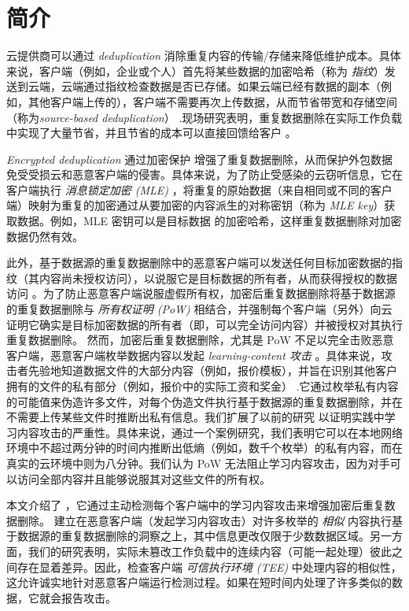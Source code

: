 \section{简介}
\label{sec:featurespy-intro}

云提供商可以通过 {\em deduplication} \cite{harnik10} 消除重复内容的传输/存储来降低维护成本。具体来说，客户端（例如，企业或个人）首先将某些数据的加密哈希（称为 {\em 指纹}）发送到云端，云端通过指纹检查数据是否已存储。如果云端已经有数据的副本（例如，其他客户端上传的），客户端不需要再次上传数据，从而节省带宽和存储空间（称为{\em source-based deduplication}） .现场研究表明，重复数据删除在实际工作负载 \cite{jin09, meyer11, wallace12} 中实现了大量节省，并且节省的成本可以直接回馈给客户 \cite{bellare13b, armknecht15}。


{\em Encrypted deduplication} 通过加密保护 \cite{bellare13a, halevi11} 增强了重复数据删除，从而保护外包数据免受受损云和恶意客户端的侵害。具体来说，为了防止受感染的云窃听信息，它在客户端执行 {\em 消息锁定加密 (MLE)} \cite{bellare13a}，将重复的原始数据（来自相同或不同的客户端）映射为重复的加密通过从要加密的内容派生的对称密钥（称为 {\em MLE key}）获取数据。例如，MLE 密钥可以是目标数据 \cite{douceur02} 的加密哈希，这样重复数据删除对加密数据仍然有效。

此外，基于数据源的重复数据删除中的恶意客户端可以发送任何目标加密数据的指纹（其内容尚未授权访问），以说服它是目标数据的所有者，从而获得授权的数据访问 \cite{ halevi11,mulazzani11}。为了防止恶意客户端说服虚假所有权，加密后重复数据删除将基于数据源的重复数据删除与 {\em 所有权证明 (PoW)} \cite{halevi11} 相结合，并强制每个客户端（另外）向云证明它确实是目标加密数据的所有者（即，可以完全访问内容）并被授权对其执行重复数据删除。
然而，加密后重复数据删除，尤其是 PoW 不足以完全击败恶意客户端，恶意客户端枚举数据内容以发起 {\em learning-content 攻击} \cite{harnik10, zuo18}。具体来说，攻击者先验地知道数据文件的大部分内容（例如，报价模板），并旨在识别其他客户拥有的文件的私有部分（例如，报价中的实际工资和奖金） .它通过枚举私有内容的可能值来伪造许多文件，对每个伪造文件执行基于数据源的重复数据删除，并在不需要上传某些文件时推断出私有信息。我们扩展了以前的研究 \cite{harnik10, zuo18} 以证明实践中学习内容攻击的严重性。具体来说，通过一个案例研究，我们表明它可以在本地网络环境中不超过两分钟的时间内推断出低熵（例如，数千个枚举）的私有内容，而在真实的云环境中则为八分钟。我们认为 PoW 无法阻止学习内容攻击，因为对手可以访问全部内容并且能够说服其对这些文件的所有权。


本文介绍了 \sysnameF，它通过主动检测每个客户端中的学习内容攻击来增强加密后重复数据删除。 \sysnameF 建立在恶意客户端（发起学习内容攻击）对许多枚举的 {\em 相似} 内容执行基于数据源的重复数据删除的洞察之上，其中信息更改仅限于少数数据区域。另一方面，我们的研究表明，实际未篡改工作负载中的连续内容（可能一起处理）彼此之间存在显着差异。因此，\sysnameF 检查客户端 {\em 可信执行环境 (TEE)} \cite{sgx} 中处理内容的相似性，这允许诚实地针对恶意客户端运行检测过程。如果在短时间内处理了许多类似的数据，它就会报告攻击。


